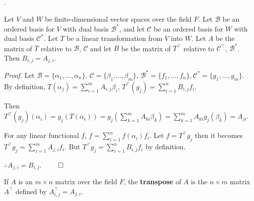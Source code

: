\documentclass[8pt]{beamer}
\newcommand{\mc}[1]{\mathcal{#1}}
\newcommand{\tb}[1]{\textbf{#1}}
\newcommand{\ti}[1]{\textit{#1}}
\begin{document}
\begin{frame}{.}
    \begin{theorem}
        Let $V$ and $W$ be finite-dimensional vector spaces over the field $F$.
        Let $\mc{B}$ be an ordered basis for $V$ with dual basis $\mc{B}^\ast$, and let $\mc{C}$ be an ordered basis for $W$ with dual basis $\mc{C}^\ast$.
        Let $T$ be a linear transformation from $V$ into $W$.
        Let $A$ be the matrix of $T$ relative to $\mc{B}$, $\mc{C}$ and let $B$ be the matrix of $T^\top$ relative to $\mc{C}^\top$, $\mc{B}^\ast$.
        Then $B_{i,j} = A_{j,i}$.
    \end{theorem}

    \ti{Proof.}
    Let $\mc{B} = \{\alpha_1, \dots, \alpha_n\}$, $\mc{C} = \{\beta_1. \dots, \beta_m\}$, $\mc{B}^\ast=\{f_1, \dots, f_n\}, \mc{C}^\ast = \{g_1, \dots, g_m\}$.
    By definition, $T(\alpha_j) = \sum_{i=1}^m A_{i, j} \beta_i$, $T^\top (g_j) = \sum_{i=1}^n B_{i,j} f_i$.

    Then $T^\top (g_j)(\alpha_i) = g_j (T(\alpha_i)) = g_j (\sum_{k=1}^m A_{ki}\beta_k) = \sum_{k=1}^m A_{ki} g_j(\beta_k) = A_{ji}$.

    For any linear functional $f$, $f = \sum_{i=1}^n f(\alpha_i) f_i$.
    Let $f = T^\top g_j$ then it becomes $T^\top g_j = \sum_{i=1}^m A_{j,i} f_i$.
    But $T^\top g_j = \sum_{i=1}^n B_{i,j} f_i$ by definition.

    $\therefore A_{j,i} = B_{i,j}$.
    $\qed$

    \begin{definition}
        If $A$ is an $m \times n$ matrix over the field $F$, the \tb{transpose} of $A$ is the $n \times m$ matrix $A^\top$ defined by $A^\top_{i,j} = A_{j,i}$.
    \end{definition}
\end{frame}
\end{document}
